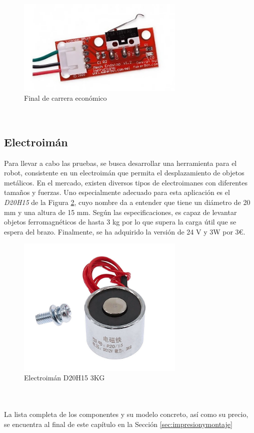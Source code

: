 \begin{figure} [ht!]
  \begin{center}
    \includegraphics[width=8cm]{figs/finaldecarrera.jpg}
  \end{center}
  \caption{Final de carrera económico}
  \label{fig:finalcarrera}
\end{figure}\ 

\subsection{Electroimán}
\noindent Para llevar a cabo las pruebas, se busca desarrollar una herramienta para el robot, consistente en un electroimán que permita 
el desplazamiento de objetos metálicos. En el mercado, existen diversos tipos de electroimanes con diferentes tamaños y fuerzas. Uno 
especialmente adecuado para esta aplicación es el \textit{D20H15} de la Figura \ref{fig:d20}, cuyo nombre da a entender que tiene un diámetro de 20 mm y una altura de 15 mm. 
Según las especificaciones, es capaz de levantar objetos ferromagnéticos de hasta 3 kg por lo que supera la carga útil que se espera del brazo. Finalmente, 
se ha adquirido la versión de 24 V y 3W por 3\euro.

\begin{figure} [ht!]
  \begin{center}
    \includegraphics[width=8cm]{figs/d20h15.jpg}
  \end{center}
  \caption{Electroimán D20H15 3KG}
  \label{fig:d20}
\end{figure}\ 
\\
\\
La lista completa de los componentes y su modelo concreto, así como su precio, se encuentra al final de este capítulo 
en la Sección \ref{sec:impresionymontaje}

